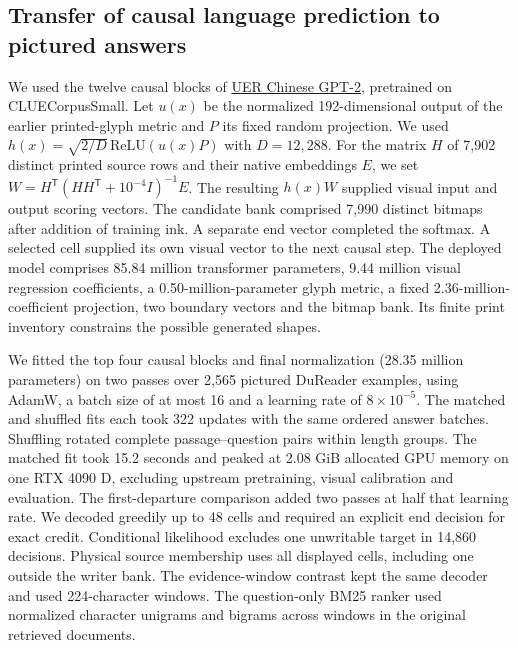 \subsection*{Transfer of causal language prediction to pictured answers}
We used the twelve causal blocks of \href{https://huggingface.co/uer/gpt2-chinese-cluecorpussmall}{UER Chinese GPT-2}, pretrained on CLUECorpusSmall. Let $u(x)$ be the normalized 192-dimensional output of the earlier printed-glyph metric and $P$ its fixed random projection. We used $h(x)=\sqrt{2/D}\,\mathrm{ReLU}(u(x)P)$ with $D=12{,}288$. For the matrix $H$ of 7,902 distinct printed source rows and their native embeddings $E$, we set $W=H^{\mathsf T}(HH^{\mathsf T}+10^{-4}I)^{-1}E$. The resulting $h(x)W$ supplied visual input and output scoring vectors. The candidate bank comprised 7,990 distinct bitmaps after addition of training ink. A separate end vector completed the softmax. A selected cell supplied its own visual vector to the next causal step. The deployed model comprises 85.84 million transformer parameters, 9.44 million visual regression coefficients, a 0.50-million-parameter glyph metric, a fixed 2.36-million-coefficient projection, two boundary vectors and the bitmap bank. Its finite print inventory constrains the possible generated shapes.

We fitted the top four causal blocks and final normalization (28.35 million parameters) on two passes over 2,565 pictured DuReader examples, using AdamW, a batch size of at most 16 and a learning rate of $8\times10^{-5}$. The matched and shuffled fits each took 322 updates with the same ordered answer batches. Shuffling rotated complete passage--question pairs within length groups. The matched fit took 15.2 seconds and peaked at 2.08 GiB allocated GPU memory on one RTX 4090 D, excluding upstream pretraining, visual calibration and evaluation. The first-departure comparison added two passes at half that learning rate. We decoded greedily up to 48 cells and required an explicit end decision for exact credit. Conditional likelihood excludes one unwritable target in 14,860 decisions. Physical source membership uses all displayed cells, including one outside the writer bank. The evidence-window contrast kept the same decoder and used 224-character windows. The question-only BM25 ranker used normalized character unigrams and bigrams across windows in the original retrieved documents.
